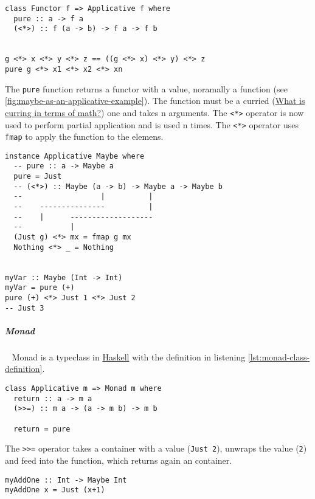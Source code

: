 \documentclass[11pt,twoside,landscape]{article}
\begin{document}
\begin{multicols}{3}
\begin{lstlisting}
class Functor f => Applicative f where
  pure :: a -> f a
  (<*>) :: f (a -> b) -> f a -> f b


g <*> x <*> y <*> z == ((g <*> x) <*> y) <*> z
pure g <*> x1 <*> x2 <*> xn
\end{lstlisting}


The \texttt{pure} function returns a functor with a value, noramally a function (see \ref{fig:maybe-as-an-applicative-example}).
The function must be a curried (\href{../../../roam/20220217093010-what_is_curring_in_terms_of_math.org}{What is curring in terms of math?}) one and takes n arguments.
The \texttt{<*>} operator is now used to perform partial application and is used n times.
The \texttt{<*>} operator uses \texttt{fmap} to apply the function to the elemens.

\begin{lstlisting}
instance Applicative Maybe where
  -- pure :: a -> Maybe a
  pure = Just
  -- (<*>) :: Maybe (a -> b) -> Maybe a -> Maybe b
  --                  |          |
  --    ---------------          |
  --    |      -------------------
  --           |
  (Just g) <*> mx = fmap g mx
  Nothing <*> _ = Nothing


myVar :: Maybe (Int -> Int)
myVar = pure (+) 
pure (+) <*> Just 1 <*> Just 2
-- Just 3
\end{lstlisting}


\subparagraph{Monad} \
\label{sec:orgee11172}
Monad is a typeclass in \href{../../../roam/20210618182407-haskell.org}{Haskell} with the definition in listening \ref{lst:monad-class-definition}.

\begin{lstlisting}
class Applicative m => Monad m where
  return :: a -> m a
  (>>=) :: m a -> (a -> m b) -> m b

  return = pure
\end{lstlisting}

The \texttt{>>=} operator takes a container with a value (\texttt{Just 2}), unwraps the value (\texttt{2}) and feed into the function, which returns again an container.

\lstset{language=haskell,label= ,caption= ,captionpos=b,numbers=none}
\begin{lstlisting}
myAddOne :: Int -> Maybe Int
myAddOne x = Just (x+1)


\end{lstlisting}
\end{multicols}
\end{document}
